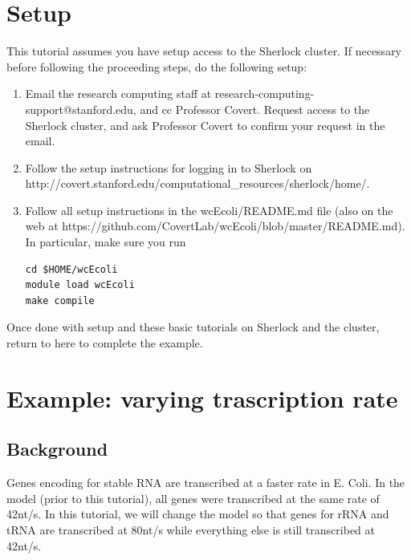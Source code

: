 \documentclass[12pt]{article}
\begin{document}
\section{Setup}
\label{sec:setup}

This tutorial assumes you have setup access to the Sherlock cluster. If necessary before following the proceeding steps, do the following setup:

\begin{enumerate}
\item Email the research computing staff at research-computing-support@stanford.edu, and cc Professor Covert. Request access to the Sherlock cluster, and ask Professor Covert to confirm your request in the email.

\item Follow the setup instructions for logging in to Sherlock on
\linebreak
http://covert.stanford.edu/computational\_resources/sherlock/home/.

\item Follow all setup instructions in the wcEcoli/README.md file (also on the web at https://github.com/CovertLab/wcEcoli/blob/master/README.md). In particular, make sure you run
\lstset{language=bash}
\begin{lstlisting}
cd $HOME/wcEcoli
module load wcEcoli
make compile
\end{lstlisting}
\end{enumerate}

Once done with setup and these basic tutorials on Sherlock and the cluster, return to here to complete the example.



\section{Example: varying trascription rate}

\subsection{Background}

Genes encoding for stable RNA are transcribed at a faster rate in E. Coli. In the model (prior to this tutorial), all genes were transcribed at the same rate of 42nt/s. In this tutorial, we will change the model so that genes for rRNA and tRNA are transcribed at 80nt/s while everything else is still transcribed at 42nt/s. 
\par
\end{document}
